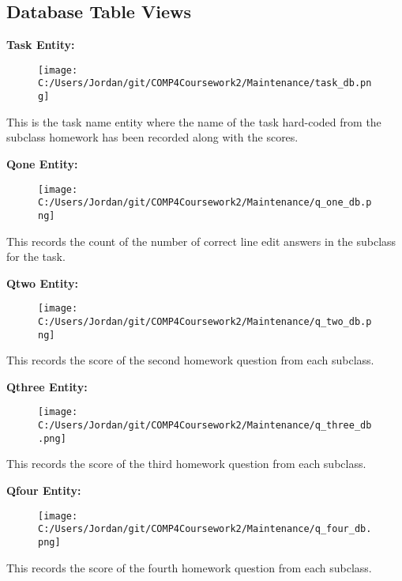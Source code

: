 \subsection{Database Table Views}

\textbf{Task Entity: }

\begin{figure}[H]
    \texttt{[image: C:/Users/Jordan/git/COMP4Coursework2/Maintenance/task\_db.png]}
    \label{fig:print_function_result}
\end{figure}

This is the task name entity where the name of the task hard-coded from the subclass homework has been recorded along with the scores.

\textbf{Qone Entity: }

\begin{figure}[H]
    \texttt{[image: C:/Users/Jordan/git/COMP4Coursework2/Maintenance/q\_one\_db.png]}
    \label{fig:print_function_result}
\end{figure}

This records the count of the number of correct line edit answers in the subclass for the task.

\textbf{Qtwo Entity: }

\begin{figure}[H]
    \texttt{[image: C:/Users/Jordan/git/COMP4Coursework2/Maintenance/q\_two\_db.png]}
    \label{fig:print_function_result}
\end{figure}

This records the score of the second homework question from each subclass.

\textbf{Qthree Entity: }

\begin{figure}[H]
    \texttt{[image: C:/Users/Jordan/git/COMP4Coursework2/Maintenance/q\_three\_db.png]}
    \label{fig:print_function_result}
\end{figure}

This records the score of the third homework question from each subclass.

\textbf{Qfour Entity: }

\begin{figure}[H]
    \texttt{[image: C:/Users/Jordan/git/COMP4Coursework2/Maintenance/q\_four\_db.png]}
    \label{fig:print_function_result}
\end{figure}

This records the score of the fourth homework question from each subclass.

